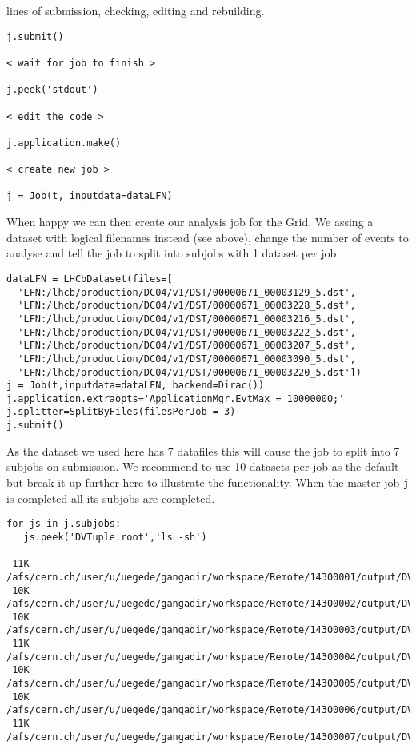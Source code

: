 \documentclass{howto}
\begin{document}
lines of submission, checking, editing and rebuilding.
\begin{verbatim}
j.submit()

< wait for job to finish >

j.peek('stdout')

< edit the code >

j.application.make()

< create new job >

j = Job(t, inputdata=dataLFN)
\end{verbatim}
When happy we can then create our analysis job for the Grid. We assing a
dataset with logical filenames instead (see above), change the number of
events to analyse and tell the job to split into subjobs with 1 dataset per
job.
\begin{verbatim}
dataLFN = LHCbDataset(files=[
  'LFN:/lhcb/production/DC04/v1/DST/00000671_00003129_5.dst',
  'LFN:/lhcb/production/DC04/v1/DST/00000671_00003228_5.dst',
  'LFN:/lhcb/production/DC04/v1/DST/00000671_00003216_5.dst',
  'LFN:/lhcb/production/DC04/v1/DST/00000671_00003222_5.dst',
  'LFN:/lhcb/production/DC04/v1/DST/00000671_00003207_5.dst',
  'LFN:/lhcb/production/DC04/v1/DST/00000671_00003090_5.dst',
  'LFN:/lhcb/production/DC04/v1/DST/00000671_00003220_5.dst'])
j = Job(t,inputdata=dataLFN, backend=Dirac())
j.application.extraopts='ApplicationMgr.EvtMax = 10000000;'
j.splitter=SplitByFiles(filesPerJob = 3)
j.submit()
\end{verbatim}
As the dataset we used here has 7 datafiles this will cause the job to split
into 7 subjobs on submission. We recommend to use 10 datasets per job as the
default but break it up further here to illustrate the functionality. When the
master job \texttt{j} is completed all its subjobs are completed.
\begin{verbatim}
for js in j.subjobs:
   js.peek('DVTuple.root','ls -sh')

 11K /afs/cern.ch/user/u/uegede/gangadir/workspace/Remote/14300001/output/DVTuple.root
 10K /afs/cern.ch/user/u/uegede/gangadir/workspace/Remote/14300002/output/DVTuple.root
 10K /afs/cern.ch/user/u/uegede/gangadir/workspace/Remote/14300003/output/DVTuple.root
 11K /afs/cern.ch/user/u/uegede/gangadir/workspace/Remote/14300004/output/DVTuple.root
 10K /afs/cern.ch/user/u/uegede/gangadir/workspace/Remote/14300005/output/DVTuple.root
 10K /afs/cern.ch/user/u/uegede/gangadir/workspace/Remote/14300006/output/DVTuple.root
 11K /afs/cern.ch/user/u/uegede/gangadir/workspace/Remote/14300007/output/DVTuple.root
\end{verbatim}
\end{document}
